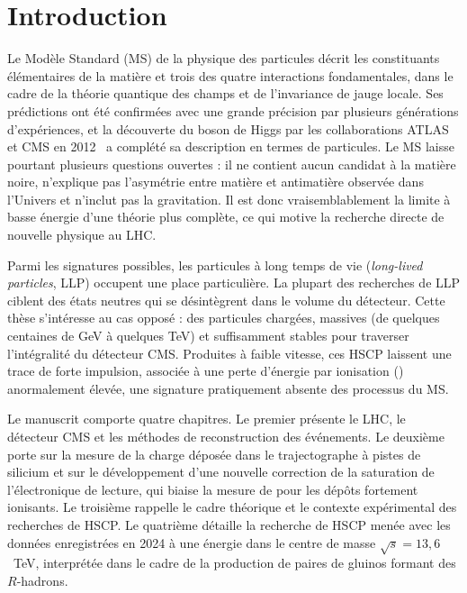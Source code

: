 \section*{Introduction}
\label{sec:resume:intro}

Le Modèle Standard (MS) de la physique des particules décrit les constituants élémentaires de la matière et trois des quatre interactions fondamentales, dans le cadre de la théorie quantique des champs et de l'invariance de jauge locale. Ses prédictions ont été confirmées avec une grande précision par plusieurs générations d'expériences, et la découverte du boson de Higgs par les collaborations ATLAS et CMS en 2012~\cite{ATLAS_Higgs, CMS_Higgs} a complété sa description en termes de particules. Le MS laisse pourtant plusieurs questions ouvertes : il ne contient aucun candidat à la matière noire, n'explique pas l'asymétrie entre matière et antimatière observée dans l'Univers et n'inclut pas la gravitation. Il est donc vraisemblablement la limite à basse énergie d'une théorie plus complète, ce qui motive la recherche directe de nouvelle physique au LHC.

Parmi les signatures possibles, les particules à long temps de vie (\textit{long-lived particles}, LLP) occupent une place particulière. La plupart des recherches de LLP ciblent des états neutres qui se désintègrent dans le volume du détecteur. Cette thèse s'intéresse au cas opposé : des particules chargées, massives (de quelques centaines de GeV à quelques TeV) et suffisamment stables pour traverser l'intégralité du détecteur CMS. Produites à faible vitesse, ces HSCP laissent une trace de forte impulsion, associée à une perte d'énergie par ionisation (\dedx) anormalement élevée, une signature pratiquement absente des processus du MS.

Le manuscrit comporte quatre chapitres. Le premier présente le LHC, le détecteur CMS et les méthodes de reconstruction des événements. Le deuxième porte sur la mesure de la charge déposée dans le trajectographe à pistes de silicium et sur le développement d'une nouvelle correction de la saturation de l'électronique de lecture, qui biaise la mesure de \dedx{} pour les dépôts fortement ionisants. Le troisième rappelle le cadre théorique et le contexte expérimental des recherches de HSCP. Le quatrième détaille la recherche de HSCP menée avec les données enregistrées en 2024 à une énergie dans le centre de masse $\sqrt{s}=13{,}6$~TeV, interprétée dans le cadre de la production de paires de gluinos formant des $R$-hadrons.


